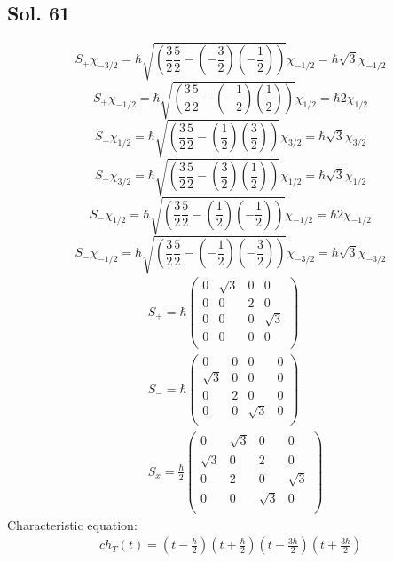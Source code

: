 \subsection*{Sol. 61}
$$
S_+ \chi_{-3/2}
=\hbar\sqrt{(\frac{3}{2}\frac{5}{2} - (-\frac{3}{2})(-\frac{1}{2}))} \chi_{-1/2}
=\hbar\sqrt{3}\chi_{-1/2}
$$
$$
S_+ \chi_{-1/2}
=\hbar\sqrt{(\frac{3}{2}\frac{5}{2} - (-\frac{1}{2})(\frac{1}{2}))} \chi_{1/2}
=\hbar2\chi_{1/2}
$$
$$
S_+ \chi_{1/2}
=\hbar\sqrt{(\frac{3}{2}\frac{5}{2} - (\frac{1}{2})(\frac{3}{2}))} \chi_{3/2}
=\hbar\sqrt{3}\chi_{3/2}
$$
$$
S_- \chi_{3/2}
=\hbar\sqrt{(\frac{3}{2}\frac{5}{2} - (\frac{3}{2})(\frac{1}{2}))} \chi_{1/2}
=\hbar\sqrt{3}\chi_{1/2}
$$
$$
S_- \chi_{1/2}
=\hbar\sqrt{(\frac{3}{2}\frac{5}{2} - (\frac{1}{2})(-\frac{1}{2}))} \chi_{-1/2}
=\hbar2\chi_{-1/2}
$$
$$
S_- \chi_{-1/2}
=\hbar\sqrt{(\frac{3}{2}\frac{5}{2} - (-\frac{1}{2})(-\frac{3}{2}))} \chi_{-3/2}
=\hbar\sqrt{3}\chi_{-3/2}
$$
\begin{align*}
    &S_+ = \hbar\begin{pmatrix}
        0 & \sqrt{3} & 0  & 0\\
        0 & 0 & 2  & 0\\
        0 & 0 & 0  & \sqrt{3}\\
        0 & 0 & 0  & 0\\
    \end{pmatrix}\\
    &S_- = \hbar\begin{pmatrix}
        0 & 0 & 0  & 0\\
        \sqrt{3} & 0 & 0  & 0\\
        0 & 2 & 0  & 0\\
        0 & 0 & \sqrt{3}  & 0\\
    \end{pmatrix}\\
    &S_x = \frac{\hbar}{2}
    \begin{pmatrix}
        0 & \sqrt{3} & 0  & 0\\
        \sqrt{3} & 0 & 2  & 0\\
        0 & 2 & 0  & \sqrt{3}\\
        0 & 0 & \sqrt{3}  & 0\\
    \end{pmatrix}
\end{align*}
Characteristic equation:
\begin{align*}
    ch_T(t) = (t-\frac{\hbar}{2})
    (t+\frac{\hbar}{2})
    (t-\frac{3\hbar}{2})
    (t+\frac{3\hbar}{2})
\end{align*}
